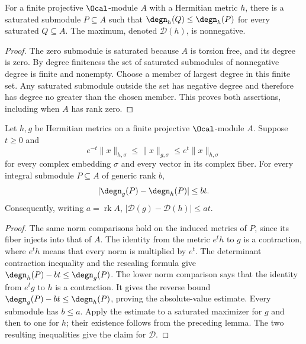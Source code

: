 \begin{lemma}
\label{lem:maximum-saturated-degree}
\leanok
{}
For a finite projective $\Ocal$-module $A$ with a Hermitian metric $h$,
there is a saturated submodule $P\subseteq A$ such that
$\degn_h(Q)\leq\degn_h(P)$ for every saturated $Q\subseteq A$.
The maximum, denoted $\mathcal D(h)$, is nonnegative.
\end{lemma}
\begin{proof}
The zero submodule is saturated because $A$ is torsion free, and its
degree is zero. By degree finiteness the set of saturated submodules
of nonnegative degree is finite and nonempty. Choose a member of
largest degree in this finite set. Any saturated submodule outside
the set has negative degree and therefore has degree no greater than
the chosen member. This proves both assertions, including when $A$
has rank zero.
\end{proof}

\begin{lemma}
\label{lem:metric-degree-comparison}
\leanok
{}
Let $h,g$ be Hermitian metrics on a finite projective $\Ocal$-module
$A$. Suppose $t\geq0$ and
\[
 e^{-t}\|x\|_{h,\sigma}\leq\|x\|_{g,\sigma}
 \leq e^t\|x\|_{h,\sigma}
\]
for every complex embedding $\sigma$ and every vector in its complex
fiber. For every integral submodule $P\subseteq A$ of generic rank $b$,
\[
 |\degn_g(P)-\degn_h(P)|\leq bt.
\]
Consequently, writing $a=\operatorname{rk}A$,
$|\mathcal D(g)-\mathcal D(h)|\leq at$.
\end{lemma}
\begin{proof}
The same norm comparisons hold on the induced metrics of $P$, since
its fiber injects into that of $A$. The identity from the metric
$e^th$ to $g$ is a contraction, where $e^th$ means that every norm is
multiplied by $e^t$. The determinant contraction inequality and the
rescaling formula give
$\degn_h(P)-bt\leq\degn_g(P)$.
The lower norm comparison says that the identity from $e^tg$ to $h$
is a contraction. It gives the reverse bound
$\degn_g(P)-bt\leq\degn_h(P)$, proving the absolute-value estimate.
Every submodule has $b\leq a$. Apply the estimate to a saturated
maximizer for $g$ and then to one for $h$; their existence follows
from the preceding lemma. The two resulting inequalities give the
claim for $\mathcal D$.
\end{proof}

